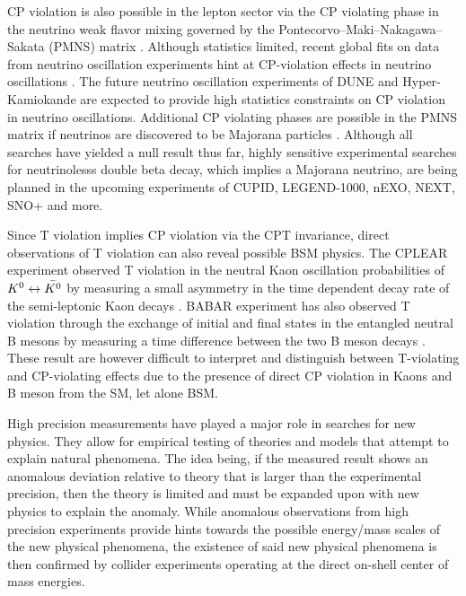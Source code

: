CP violation is also possible in the lepton sector via the CP violating phase in the neutrino weak flavor mixing governed by the Pontecorvo–Maki–Nakagawa–Sakata (PMNS) matrix \cite{Maki1962, Agostini2023}. Although statistics limited, recent global fits on data from neutrino oscillation experiments hint at CP-violation effects in neutrino oscillations \cite{deSalas2021, Gonzalez-Garcia2021, Denton2021}. The future neutrino oscillation experiments of DUNE \cite{Abi2020} and Hyper-Kamiokande \cite{DiLodovico2017} are expected to provide high statistics constraints on CP violation in neutrino oscillations. Additional CP violating phases are possible in the PMNS matrix if neutrinos are discovered to be Majorana particles \cite{Agostini2023}. Although all searches have yielded a null result thus far, highly sensitive experimental searches for neutrinolesss double beta decay, which implies a Majorana neutrino, are being planned in the upcoming experiments of CUPID\cite{Cupid2019}, LEGEND-1000\cite{Legend2021}, nEXO\cite{Adhikari2022}, NEXT\cite{Adams2021}, SNO+\cite{Albanese2021} and more. 

Since T violation implies CP violation via the CPT invariance, direct observations of T violation can also reveal possible BSM physics. The CPLEAR experiment observed T violation in the neutral Kaon oscillation probabilities of $ K^0 \leftrightarrow \Bar{K^0}$ by measuring a small asymmetry in the time dependent decay rate of the semi-leptonic Kaon decays \cite{Angelopoulos1998}. BABAR experiment has also observed T violation through the exchange of initial and final states in the entangled neutral B mesons by measuring a time difference between the two B meson decays \cite{Lees2012}. These result are however difficult to interpret and distinguish between T-violating and CP-violating effects due to the presence of direct CP violation in Kaons and B meson from the SM, let alone BSM.

High precision measurements have played a major role in searches for new physics. They allow for empirical testing of theories and models that attempt to explain natural phenomena. The idea being, if the measured result shows an anomalous deviation relative to theory that is larger than the experimental precision, then the theory is limited and must be expanded upon with new physics to explain the anomaly. While anomalous observations from high precision experiments provide hints towards the possible energy/mass scales of the new physical phenomena, the existence of said new physical phenomena is then confirmed by collider experiments operating at the direct on-shell center of mass energies.  

